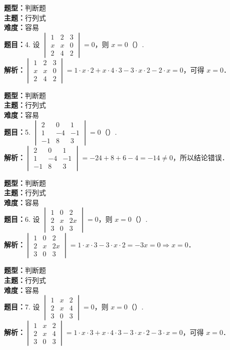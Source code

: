 \documentclass{ctexart}
\newenvironment{question}[5]{%
	\noindent\textbf{题型：}#1\\
	\textbf{主题：}#2\\
	\textbf{难度：}#3\\
	\textbf{题目：}#4\\
	\textbf{解析：}#5\\
	\vspace{1em}
}{}
\begin{document}
	\begin{question}
		{判断题}
		{行列式}
		{容易}
		{4. 设 \(\begin{vmatrix} 1 & 2 & 3 \\ x & x & 0 \\ 2 & 4 & 2\end{vmatrix}=0\)，则 \(x=0\)（）. }
		{\(\begin{vmatrix} 1 & 2 & 3 \\ x & x & 0 \\ 2 & 4 & 2\end{vmatrix}=1 \cdot x \cdot 2 + x \cdot 4 \cdot 3 - 3 \cdot x \cdot 2 - 2 \cdot x = 0\)，可得 \(x=0\)．}
	\end{question}
	
	\begin{question}
		{判断题}
		{行列式}
		{容易}
		{5. \(\begin{vmatrix} 2 & 0 & 1 \\ 1 & -4 & -1 \\ -1 & 8 & 3\end{vmatrix}=0\)（）. }
		{\(\begin{vmatrix} 2 & 0 & 1 \\ 1 & -4 & -1 \\ -1 & 8 & 3\end{vmatrix} = -24 + 8 + 6 - 4 = -14 \ne 0\)，所以结论错误．}
	\end{question}
	
	\begin{question}
		{判断题}
		{行列式}
		{容易}
		{6. 设 \(\begin{vmatrix} 1 & 0 & 2 \\ 2 & x & 2x \\ 3 & 0 & 3\end{vmatrix}=0\)，则 \(x=0\)（）. }
		{\(\begin{vmatrix} 1 & 0 & 2 \\ 2 & x & 2x \\ 3 & 0 & 3\end{vmatrix}=1 \cdot x \cdot 3 - 3 \cdot x \cdot 2 = -3x=0 \Rightarrow x=0\)．}
	\end{question}
	
	\begin{question}
		{判断题}
		{行列式}
		{容易}
		{7. 设 \(\begin{vmatrix} 1 & x & 2 \\ 2 & x & 4 \\ 3 & 0 & 3\end{vmatrix}=0\)，则 \(x=0\)（）. }
		{\(\begin{vmatrix} 1 & x & 2 \\ 2 & x & 4 \\ 3 & 0 & 3\end{vmatrix} = 1 \cdot x \cdot 3 + x \cdot 4 \cdot 3 - 3 \cdot x \cdot 2 - 3 \cdot x = 0\)，可得 \(x=0\)．}
	\end{question}
	
\end{document}
